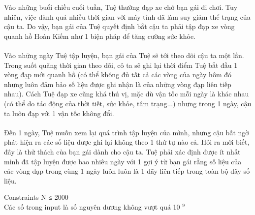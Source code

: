 Vào những buổi chiều cuối tuần, Tuệ thường đạp xe chở bạn gái đi chơi. Tuy nhiên, việc dành quá nhiều thời gian với máy tính đã làm suy giảm thể trạng của cậu ta. Do vậy, bạn gái của Tuệ quyết định bắt cậu ta phải tập đạp xe vòng quanh hồ Hoàn Kiếm như 1 biện pháp để tăng cường sức khỏe.   
\\
\\   Vào những ngày Tuệ tập luyện, bạn gái của Tuệ sẽ tới theo dõi cậu ta một lần. Trong suốt quãng thời gian theo dõi, cô ta sẽ ghi lại thời điểm Tuệ bắt đầu 1 vòng đạp mới quanh hồ (có thể không đủ tất cả các vòng của ngày hôm đó nhưng luôn đảm bảo số liệu được ghi nhận là của những vòng đạp liên tiếp nhau). Cách Tuệ đạp xe cũng khá thú vị, mặc dù vận tốc mỗi ngày là khác nhau (có thể do tác động của thời tiết, sức khỏe, tâm trạng...) nhưng trong 1 ngày, cậu ta luôn đạp với 1 vận tốc không đổi.   
\\
\\   Đến 1 ngày, Tuệ muốn xem lại quá trình tập luyện của mình, nhưng cậu bất ngờ phát hiện ra các số liệu được ghi lại không theo 1 thứ tự nào cả. Hỏi ra mới biết, đây là thử thách của bạn gái dành cho cậu ta. Tuệ phải xác định được ít nhất mình đã tập luyện được bao nhiêu ngày với 1 gợi ý từ bạn gái rằng số liệu của các vòng đạp trong cùng 1 ngày luôn luôn là 1 dãy liên tiếp trong toàn bộ dãy số liệu.  

Constraints
N ≤ 2000   
\\   Các số trong input là số nguyên dương không vượt quá 10   $^    9   $
